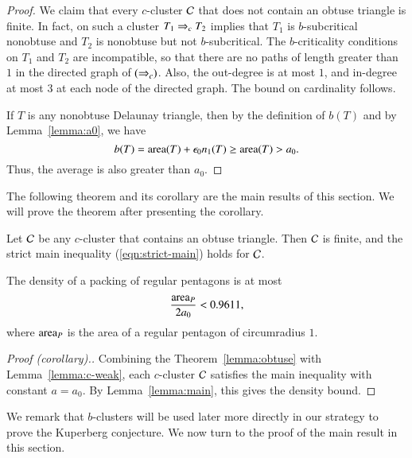 \begin{proof}  
  We claim that every $c$-cluster $\mathcal C$ that does not contain
 an obtuse triangle is finite.
  In fact, on such a cluster $T_1\Rightarrow_{c} T_2$ implies that $T_1$ is
  $b$-subcritical nonobtuse and $T_2$ is nonobtuse but not
  $b$-subcritical.  The $b$-criticality conditions on $T_1$ and $T_2$
  are incompatible, so that there are no paths of length greater than
  $1$ in the directed graph of $(\Rightarrow_{c})$.  Also, the out-degree is at
  most $1$, and in-degree at most $3$ at each node of the directed
  graph.   The bound on cardinality follows.

  If $T$ is any nonobtuse Delaunay triangle, then by the definition of
  $b(T)$ and by Lemma~\ref{lemma:a0}, we have
\[
b(T) = {\operatorname{area}}(T)+\epsilon_0 n_1(T) \ge {\operatorname{area}}(T) > a_0.
\]
Thus, the average is also greater than $a_0$.
\end{proof}

The following theorem and its corollary are the main results of this
section.  We will prove the theorem after presenting the corollary.

\begin{theorem}\label{lemma:obtuse}  
  Let $\mathcal C$ be any $c$-cluster that contains an obtuse triangle.  Then
  $\mathcal C$ is finite, and the strict main inequality
  (\ref{eqn:strict-main}) holds for $\mathcal C$.
\end{theorem}

\begin{corollary}\label{lemma:961}  
  The density of a packing of regular pentagons is at most
\[
\frac{{\operatorname{area}}_P}{2a_0} < 0.9611,
\] %
where ${\operatorname{area}}_P$ is the area of a regular pentagon of circumradius $1$.
\end{corollary}

\begin{proof}[Proof (corollary).] 
  Combining the Theorem~\ref{lemma:obtuse} with
  Lemma~\ref{lemma:c-weak}, 
  each $c$-cluster $\mathcal C$ satisfies
  the main inequality with constant $a=a_0$.  By
  Lemma~\ref{lemma:main}, this gives the density bound.
\end{proof}

We remark that $b$-clusters will be used later more directly in our
strategy to prove the Kuperberg conjecture.  We now turn to the proof
of the main result in this section.

